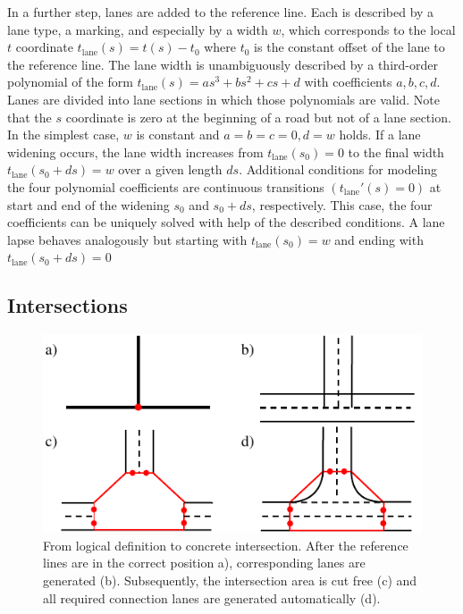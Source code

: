 \documentclass[a4paper, 10pt, conference]{ieeeconf}      %
\begin{document}
    In a further step, lanes are added to the reference line. Each is described by a lane type, a marking, and especially by a width $w$, which corresponds to the local $t$ coordinate $t_\text{lane}(s)=t(s)-t_0$ where $t_0$ is the constant offset of the lane to the reference line. The lane width is unambiguously described by a third-order polynomial of the form $t_\text{lane}(s) = as^3 + bs^2 + cs + d$ with coefficients \(a,b,c,d\). Lanes are divided into lane sections in which those polynomials are valid. Note that the $s$ coordinate is zero at the beginning of a road but not of a lane section. In the simplest case, $w$ is constant and $a=b=c=0, d=w$ holds. If a lane widening occurs, the lane width increases from $t_\text{lane}(s_0)=0$ to the final width $t_\text{lane}(s_0+ds)=w$ over a given length $ds$. Additional conditions for modeling the four polynomial coefficients are continuous transitions \(\left(t_\text{lane}'(s) = 0\right)\) at start and end of the widening $s_0$ and $s_0 + ds$, respectively. This case, the four coefficients can be uniquely solved with help of the described conditions. A lane lapse behaves analogously but starting with $t_\text{lane}(s_0)=w$ and ending with $t_\text{lane}(s_0+ds)=0$
        
\subsection{Intersections}\label{sec_inters}
    \begin{figure}[thpb]        
        \centering
        \includegraphics{fig/createJunction.pdf}
        \caption{From logical definition to concrete intersection. After the reference lines are in the correct position a), corresponding lanes are generated (b). Subsequently, the intersection area is cut free (c) and all required connection lanes are generated automatically (d).}
        \label{fig_createJunction}
    \end{figure}
	
\end{document}
